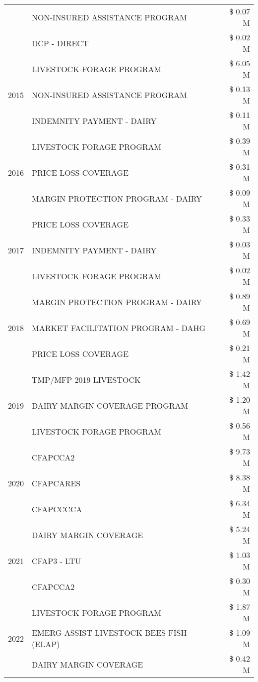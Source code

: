 \begin{tabular}{llr}
 & NON-INSURED ASSISTANCE PROGRAM & \$ 0.07 M \\
 & DCP - DIRECT & \$ 0.02 M \\
\cline{1-3}
\multirow[t]{3}{*}{2015} & LIVESTOCK FORAGE PROGRAM & \$ 6.05 M \\
 & NON-INSURED ASSISTANCE PROGRAM & \$ 0.13 M \\
 & INDEMNITY PAYMENT - DAIRY & \$ 0.11 M \\
\cline{1-3}
\multirow[t]{3}{*}{2016} & LIVESTOCK FORAGE PROGRAM & \$ 0.39 M \\
 & PRICE LOSS COVERAGE & \$ 0.31 M \\
 & MARGIN PROTECTION PROGRAM - DAIRY & \$ 0.09 M \\
\cline{1-3}
\multirow[t]{3}{*}{2017} & PRICE LOSS COVERAGE & \$ 0.33 M \\
 & INDEMNITY PAYMENT - DAIRY & \$ 0.03 M \\
 & LIVESTOCK FORAGE PROGRAM & \$ 0.02 M \\
\cline{1-3}
\multirow[t]{3}{*}{2018} & MARGIN PROTECTION PROGRAM - DAIRY & \$ 0.89 M \\
 & MARKET FACILITATION PROGRAM - DAHG & \$ 0.69 M \\
 & PRICE LOSS COVERAGE & \$ 0.21 M \\
\cline{1-3}
\multirow[t]{3}{*}{2019} & TMP/MFP 2019 LIVESTOCK & \$ 1.42 M \\
 & DAIRY MARGIN COVERAGE PROGRAM & \$ 1.20 M \\
 & LIVESTOCK FORAGE PROGRAM & \$ 0.56 M \\
\cline{1-3}
\multirow[t]{3}{*}{2020} & CFAPCCA2 & \$ 9.73 M \\
 & CFAPCARES & \$ 8.38 M \\
 & CFAPCCCCA & \$ 6.34 M \\
\cline{1-3}
\multirow[t]{3}{*}{2021} & DAIRY MARGIN COVERAGE & \$ 5.24 M \\
 & CFAP3 - LTU & \$ 1.03 M \\
 & CFAPCCA2 & \$ 0.30 M \\
\cline{1-3}
\multirow[t]{3}{*}{2022} & LIVESTOCK FORAGE PROGRAM & \$ 1.87 M \\
 & EMERG ASSIST LIVESTOCK BEES FISH (ELAP) & \$ 1.09 M \\
 & DAIRY MARGIN COVERAGE & \$ 0.42 M \\
\cline{1-3}
\bottomrule
\end{tabular}
